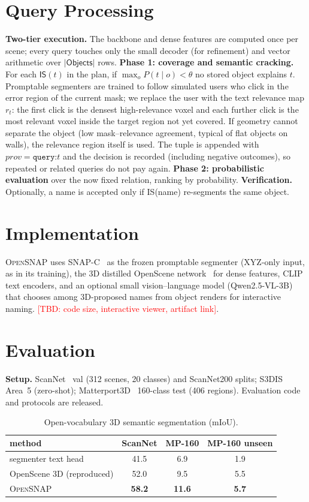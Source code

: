 \documentclass[conference]{IEEEtran}
\newcommand{\TBD}[1]{\textcolor{red}{[TBD: #1]}}
\newcommand{\sys}{\textsc{OpenSNAP}}
\begin{document}
\section{Query Processing}\label{sec:proc}
\textbf{Two-tier execution.} The backbone and dense features are computed once per scene; every query touches only
the small decoder (for refinement) and vector arithmetic over $|\textsf{Objects}|$ rows.
\textbf{Phase 1: coverage and semantic cracking.} For each $\textsf{IS}(t)$ in the plan, if $\max_o P(t\mid o)<\theta$
no stored object explains $t$. Promptable segmenters are trained to follow simulated users who click in the error region
of the current mask; we replace the user with the text relevance map $r_t$: the first click is the densest
high-relevance voxel and each further click is the most relevant voxel inside the target region not yet covered. If
geometry cannot separate the object (low mask--relevance agreement, typical of flat objects on walls), the relevance
region itself is used. The tuple is appended with $prov=\texttt{query:}t$ and the decision is recorded (including
negative outcomes), so repeated or related queries do not pay again.
\textbf{Phase 2: probabilistic evaluation} over the now fixed relation, ranking by probability.
\textbf{Verification.} Optionally, a name is accepted only if \textsf{IS}(name) re-segments the same object.

\section{Implementation}
\sys{} uses SNAP-C~\cite{snap} as the frozen promptable segmenter (XYZ-only input, as in its training), the 3D
distilled OpenScene network~\cite{openscene} for dense features, CLIP~\cite{clip} text encoders, and an optional small
vision--language model (Qwen2.5-VL-3B) that chooses among 3D-proposed names from object renders for interactive naming.
\TBD{code size, interactive viewer, artifact link}.

\section{Evaluation}\label{sec:exp}
\textbf{Setup.} ScanNet~\cite{scannet} val (312 scenes, 20 classes) and ScanNet200 splits; S3DIS~\cite{s3dis} Area~5
(zero-shot); Matterport3D~\cite{matterport} 160-class test (406 regions). Evaluation code and protocols are released.

\begin{table}[t]\centering\caption{Open-vocabulary 3D semantic segmentation (mIoU).}\label{tab:semseg}
\begin{tabular}{lccc}\toprule
method & ScanNet & MP-160 & MP-160 unseen \\\midrule
segmenter text head & 41.5 & 6.9 & 1.9 \\
OpenScene 3D (reproduced) & 52.0 & 9.5 & 5.5 \\
\sys{} & \textbf{58.2} & \textbf{11.6} & \textbf{5.7} \\\bottomrule
\end{tabular}\end{table}
\end{document}
